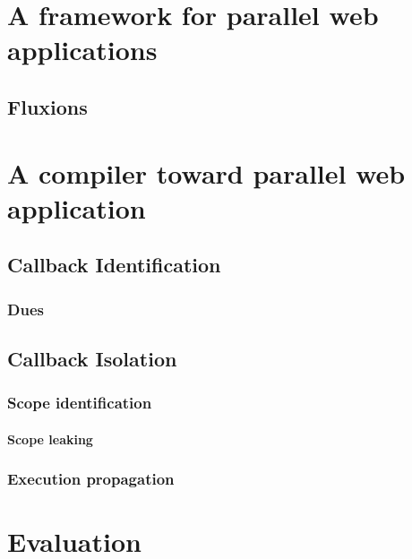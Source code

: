 \documentclass[12pt]{report}
\begin{document}
% 

\chapter{A framework for parallel web applications}
  \section{Fluxions}

\chapter{A compiler toward parallel web application}
  \section{Callback Identification}
    \subsection{Dues}
    \subsection{}
  \section{Callback Isolation}
    \subsection{Scope identification}
      \subsubsection{Scope leaking}
    \subsection{Execution propagation}

\chapter{Evaluation}




\printbibliography[]
\end{document}

